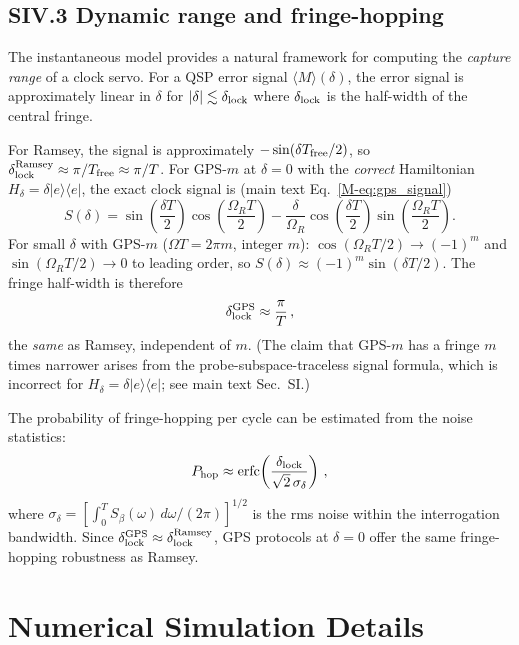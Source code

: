 \documentclass[aps,pra,twocolumn,superscriptaddress,longbibliography]{revtex4-2}
\newcommand{\be}{\begin{equation}}
\newcommand{\ee}{\end{equation}}
\begin{document}
\subsection*{SIV.3 Dynamic range and fringe-hopping}

The instantaneous model provides a natural framework for computing the \emph{capture range}
of a clock servo.
For a QSP error signal $\langle M\rangle(\delta)$,
the error signal is approximately linear in $\delta$ for $|\delta| \lesssim \delta_{\rm lock}$
where $\delta_{\rm lock}$ is the half-width of the central fringe.

For Ramsey, the signal is approximately $-\sin(\delta T_{\rm free}/2)$, so
$\delta_{\rm lock}^{\rm Ramsey} \approx \pi/T_{\rm free} \approx \pi/T$.
For GPS-$m$ at $\delta = 0$ with the \emph{correct} Hamiltonian
$H_\delta = \delta|e\rangle\langle e|$, the exact clock signal is
(main text Eq.~\eqref{M-eq:gps_signal})
\be
  S(\delta) = \sin\!\left(\frac{\delta T}{2}\right)\cos\!\left(\frac{\Omega_R T}{2}\right)
  - \frac{\delta}{\Omega_R}\cos\!\left(\frac{\delta T}{2}\right)\sin\!\left(\frac{\Omega_R T}{2}\right).
\ee
For small $\delta$ with GPS-$m$ ($\Omega T = 2\pi m$, integer $m$):
$\cos(\Omega_R T/2) \to (-1)^m$ and $\sin(\Omega_R T/2) \to 0$ to leading order, so
$S(\delta) \approx (-1)^m \sin(\delta T/2)$.
The fringe half-width is therefore
\be
  \delta_{\rm lock}^{\rm GPS} \approx \frac{\pi}{T}\,,
\ee
the \emph{same} as Ramsey, independent of $m$.
(The claim that GPS-$m$ has a fringe $m$ times narrower arises from the
probe-subspace-traceless signal formula, which is incorrect for
$H_\delta = \delta|e\rangle\langle e|$; see main text Sec.~SI.)

The probability of fringe-hopping per cycle can be estimated from the noise statistics:
\be
  P_{\rm hop} \approx \mathrm{erfc}\!\left(\frac{\delta_{\rm lock}}{\sqrt{2}\,\sigma_\delta}\right)\,,
  \label{eq:phop}
\ee
where $\sigma_\delta = [\int_0^T S_\beta(\omega)\,d\omega/(2\pi)]^{1/2}$ is the rms noise
within the interrogation bandwidth.
Since $\delta_{\rm lock}^{\rm GPS} \approx \delta_{\rm lock}^{\rm Ramsey}$,
GPS protocols at $\delta=0$ offer the same fringe-hopping robustness as Ramsey.


\section{Numerical Simulation Details}
\label{supp:numerics}
\end{document}
